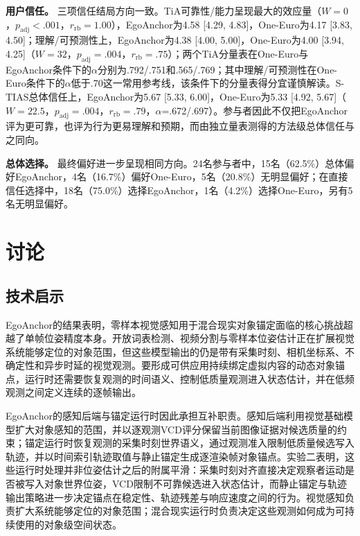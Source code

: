 \documentclass[review]{vgtc}
\begin{document}
\textbf{用户信任。}
三项信任结局方向一致。TiA可靠性/能力呈现最大的效应量（$W=0$，$p_{\mathrm{adj}}<.001$，$r_{\mathrm{rb}}=1.00$），EgoAnchor为4.58 [4.29, 4.83]，One-Euro为4.17 [3.83, 4.50]；理解/可预测性上，EgoAnchor为4.38 [4.00, 5.00]，One-Euro为4.00 [3.94, 4.25]（$W=32$，$p_{\mathrm{adj}}=.004$，$r_{\mathrm{rb}}=.75$）；两个TiA分量表在One-Euro与EgoAnchor条件下的$\alpha$分别为.792/.751和.565/.769；其中理解/可预测性在One-Euro条件下的$\alpha$低于.70这一常用参考线，该条件下的分量表得分宜谨慎解读。S-TIAS总体信任上，EgoAnchor为5.67 [5.33, 6.00]，One-Euro为5.33 [4.92, 5.67]（$W=22.5$，$p_{\mathrm{adj}}=.004$，$r_{\mathrm{rb}}=.79$，$\alpha$=.672/.697）。参与者因此不仅把EgoAnchor评为更可靠，也评为行为更易理解和预期，而由独立量表测得的方法级总体信任与之同向。

\textbf{总体选择。}
最终偏好进一步呈现相同方向。24名参与者中，15名（62.5\%）总体偏好EgoAnchor，4名（16.7\%）偏好One-Euro，5名（20.8\%）无明显偏好；在直接信任选择中，18名（75.0\%）选择EgoAnchor，1名（4.2\%）选择One-Euro，另有5名无明显偏好。

\section{讨论}\label{sec:discussion}

\subsection{技术启示}

EgoAnchor的结果表明，零样本视觉感知用于混合现实对象锚定面临的核心挑战超越了单帧位姿精度本身。开放词表检测、视频分割与零样本位姿估计正在扩展视觉系统能够定位的对象范围，但这些模型输出的仍是带有采集时刻、相机坐标系、不确定性和异步时延的视觉观测。要形成可供应用持续绑定虚拟内容的动态对象锚点，运行时还需要恢复观测的时间语义、控制低质量观测进入状态估计，并在低频观测之间定义连续的逐帧输出。

EgoAnchor的感知后端与锚定运行时因此承担互补职责。感知后端利用视觉基础模型扩大对象感知的范围，并以逐观测VCD评分保留当前图像证据对候选质量的约束；锚定运行时恢复观测的采集时刻世界语义，通过观测准入限制低质量候选写入轨迹，并以时间索引轨迹取值与静止锚定生成逐渲染帧对象锚点。实验二表明，这些运行时处理并非位姿估计之后的附属平滑：采集时刻对齐直接决定观察者运动是否被写入对象世界位姿，VCD限制不可靠候选进入状态估计，而静止锚定与轨迹输出策略进一步决定锚点在稳定性、轨迹残差与响应速度之间的行为。视觉感知负责扩大系统能够定位的对象范围；混合现实运行时负责决定这些观测如何成为可持续使用的对象级空间状态。
\end{document}
